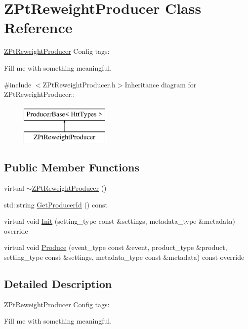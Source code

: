 \hypertarget{classZPtReweightProducer}{
\section{ZPtReweightProducer Class Reference}
\label{classZPtReweightProducer}
}


\hyperlink{classZPtReweightProducer}{ZPtReweightProducer} Config tags:
\begin{DoxyItemize}
\item Fill me with something meaningful. 
\end{DoxyItemize} 


{\ttfamily \#include $<$ZPtReweightProducer.h$>$}Inheritance diagram for ZPtReweightProducer::\begin{figure}[H]
\begin{center}
\leavevmode
\includegraphics[height=2cm]{classZPtReweightProducer}
\end{center}
\end{figure}
\subsection*{Public Member Functions}
\begin{DoxyCompactItemize}
\item 
virtual \hyperlink{classZPtReweightProducer_a4a10d9fc59ccd6e5cdb8f627f87ae390}{$\sim$ZPtReweightProducer} ()
\item 
std::string \hyperlink{classZPtReweightProducer_af8a71db4b608877d853a618ccc2257ce}{GetProducerId} () const 
\item 
virtual void \hyperlink{classZPtReweightProducer_a57426136c490159fcd836a97fff8da8e}{Init} (setting\_\-type const \&settings, metadata\_\-type \&metadata) override
\item 
virtual void \hyperlink{classZPtReweightProducer_aa3d766c0f8dc568480f59563bd73a824}{Produce} (event\_\-type const \&event, product\_\-type \&product, setting\_\-type const \&settings, metadata\_\-type const \&metadata) const override
\end{DoxyCompactItemize}


\subsection{Detailed Description}
\hyperlink{classZPtReweightProducer}{ZPtReweightProducer} Config tags:
\begin{DoxyItemize}
\item Fill me with something meaningful. 
\end{DoxyItemize}

